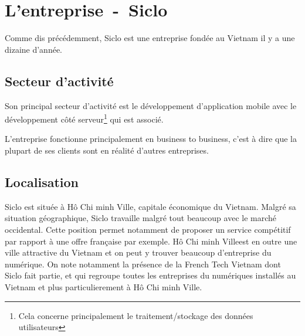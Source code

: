 \documentclass[../rapport.tex]{subfiles}
\newcommand{\hcmc}{Hô Chi minh Ville}
\begin{document}
    \chapter{L'entreprise~-~Siclo}
        Comme dis précédemment, Siclo est une entreprise fondée au Vietnam il y a une dizaine d'année.
        \section{Secteur d'activité}
        Son principal secteur d'activité est le développement d'application
        mobile avec le développement côté serveur\footnote{Cela concerne
        principalement le traitement/stockage des données utilisateurs} qui est
        associé.

        L'entreprise fonctionne principalement en business to business, c'est à
        dire que la plupart de ses clients sont en réalité d'autres
        entreprises.

        \section{Localisation}
        Siclo est située à \hcmc, capitale économique du Vietnam.
        Malgré sa situation géographique, Siclo travaille malgré tout beaucoup
        avec le marché occidental. Cette position permet notamment de proposer
        un service compétitif par rapport à une offre française par exemple.
        \hcmc est en outre une ville attractive du Vietnam et on peut
        y trouver beaucoup d'entreprise du numérique. On note notamment la présence
        de la \og French Tech Vietnam \fg dont Siclo fait partie, et qui regroupe toutes
        les entreprises du numériques installés au Vietnam et plus particulierement à \hcmc.
\end{document}
